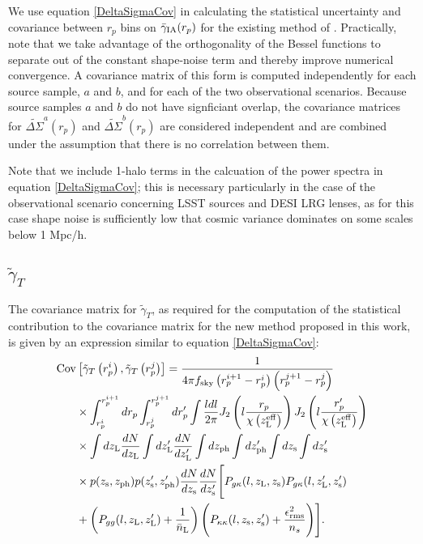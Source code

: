 \documentclass[a4paper,fleqn,usenatbib]{mnras}
\begin{document}
We use equation \ref{DeltaSigmaCov} in calculating the statistical uncertainty and covariance between $r_p$ bins on $\bar{\gamma}_{\rm IA}(r_p)$ for the existing method of \cite{Blazek2012}. Practically, note that we take advantage of the orthogonality of the Bessel functions to separate out of the constant shape-noise term and thereby improve numerical convergence. A covariance matrix of this form is computed independently for each source sample, $a$ and $b$, and for each of the two observational scenarios. Because source samples $a$ and $b$ do not have signficiant overlap, the covariance matrices for $\widetilde{\Delta \Sigma}^a(r_p)$ and $\widetilde{\Delta \Sigma}^b(r_p)$ are considered independent and are combined under the assumption that there is no correlation between them. 

Note that we include 1-halo terms in the calcuation of the power spectra in equation \ref{DeltaSigmaCov}; this is necessary particularly in the case of the observational scenario concerning LSST sources and DESI LRG lenses, as for this case shape noise is sufficiently low that cosmic variance dominates on some scales below 1 Mpc/h.

\subsection{$\tilde{\gamma}_T$}

The covariance matrix for $\tilde{\gamma}_T$, as required for the computation of the statistical contribution to the covariance matrix for the new method proposed in this work, is given by an expression similar to equation \ref{DeltaSigmaCov}:
\begin{align}
{\rm Cov}&\left[\tilde{\gamma}_T\left(r_p^i\right),\tilde{\gamma}_T \left(r_p^j\right) \right] = \frac{1}{4\pi f_{ \rm sky}\left(r_p^{i+1}-r_p^i \right)\left(r_p^{j+1}-r_p^j\right) } \nonumber \\ & \times \int_{r_p^i}^{r_p^{i+1}} dr_p \int_{r_p^j}^{r_p^{j+1}} dr_p^\prime \int \frac{l dl}{2\pi} J_2\left(l\frac{r_p}{\chi\left(z_{{\rm L}}^{\rm eff}\right)}\right) J_2\left(l\frac{r_p^\prime}{\chi\left(z_{{\rm L}}^{\rm eff}\right)}\right)   \nonumber \\ &\times \int d z_{\rm L} \frac{dN}{dz_{\rm L}} \int d z_{\rm L}^\prime \frac{dN}{dz_{\rm L}^\prime} \int d z_{\rm ph} \int d z_{\rm ph}^\prime  \int dz_{\rm s} \int dz_{\rm s}^\prime \nonumber \\ & \times p(z_{\rm s}, z_{\rm ph}) p(z_{\rm s}^\prime, z_{\rm ph}^\prime)\frac{dN}{dz_{\rm s}} \frac{dN}{dz_{\rm s}^\prime} \Bigg[P_{g\kappa}(l,z_{\rm L} ,z_{\rm s} )P_{g\kappa}(l, z_{\rm L}^\prime ,z_{\rm s}^\prime) \nonumber \\ &+ \left(P_{gg}(l, z_{\rm L}, z_{\rm L}^\prime)+\frac{1}{\bar{n}_{\rm L}}\right)\Bigg( P_{\kappa\kappa}(l, z_{\rm s}, z_{\rm s}^\prime) + \frac{\epsilon_{\rm rms}^2}{n_s} \Bigg)\Bigg].
\label{GammaCov}
\end{align}
\end{document}
